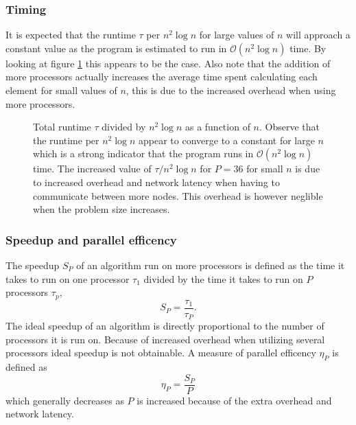 \documentclass[11pt,a4paper,english]{article}
\numberwithin{figure}{subsection}
\numberwithin{table}{subsection}
\begin{document}
\subsubsection{Timing}

It is expected that the runtime $\tau$ per $n^2\log n$ for large values of $n$ will approach a constant value as the program is estimated to run in $\mathcal{O}(n^2\log n)$ time. By looking at figure \ref{fig:time1} this appears to be the case. Also note that the addition of more processors actually increases the average time spent calculating each element for small values of $n$, this is due to the increased overhead when using more processors.

\begin{figure}[tbp]
	\centering
	
	\caption{Total runtime $\tau$ divided by $n^2\log n$ as a function of $n$. Observe that the runtime per $n^2\log n$ appear to converge to a constant for large $n$ which is a strong indicator that the program runs in $\mathcal{O}(n^2 \log n)$ time. The increased value of $\tau /n^2\log n$ for $P=36$ for small $n$ is due to increased overhead and network latency when having to communicate between more nodes. This overhead is however neglible when the problem size increases.}
		\label{fig:time1}
\end{figure}

\subsubsection{Speedup and parallel efficency}
The speedup $S_P$ of an algorithm run on more processors is defined as the time it takes to run on one processor $\tau_1$ divided by the time it takes to run on $P$ processors $\tau_p$,
\begin{equation}
	S_P = \frac{\tau_1}{\tau_P}.
\end{equation}
The ideal speedup of an algorithm is directly proportional to the number of processors it is run on. Because of increased overhead when utilizing several processors ideal speedup is not obtainable. A measure of parallel efficency $\eta_P$ is defined as
\begin{equation}
	\eta_P = \frac{S_P}{P}
\end{equation}
which generally decreases as $P$ is increased because of the extra overhead and network latency.
\end{document}
